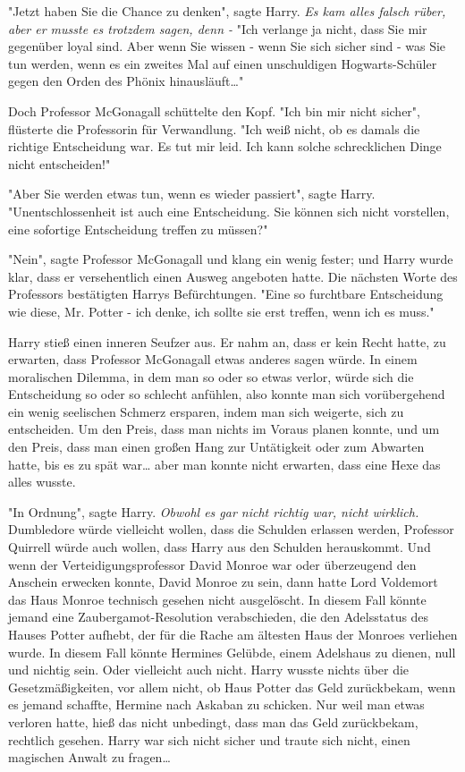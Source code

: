 {"Jetzt haben Sie die Chance zu denken", sagte Harry. \emph{Es kam alles falsch rüber, aber er musste es trotzdem sagen, denn -} "Ich verlange ja nicht, dass Sie mir gegenüber loyal sind. Aber wenn Sie wissen - wenn Sie sich sicher sind - was Sie tun werden, wenn es ein zweites Mal auf einen unschuldigen Hogwarts-Schüler gegen den Orden des Phönix hinausläuft…"

Doch Professor McGonagall schüttelte den Kopf. "Ich bin mir nicht sicher", flüsterte die Professorin für Verwandlung. "Ich weiß nicht, ob es damals die richtige Entscheidung war. Es tut mir leid. Ich kann solche schrecklichen Dinge nicht entscheiden!"

"Aber Sie werden etwas tun, wenn es wieder passiert", sagte Harry. "Unentschlossenheit ist auch eine Entscheidung. Sie können sich nicht vorstellen, eine sofortige Entscheidung treffen zu müssen?"

"Nein", sagte Professor McGonagall und klang ein wenig fester; und Harry wurde klar, dass er versehentlich einen Ausweg angeboten hatte. Die nächsten Worte des Professors bestätigten Harrys Befürchtungen. "Eine so furchtbare Entscheidung wie diese, Mr. Potter - ich denke, ich sollte sie erst treffen, wenn ich es muss."

Harry stieß einen inneren Seufzer aus. Er nahm an, dass er kein Recht hatte, zu erwarten, dass Professor McGonagall etwas anderes sagen würde. In einem moralischen Dilemma, in dem man so oder so etwas verlor, würde sich die Entscheidung so oder so schlecht anfühlen, also konnte man sich vorübergehend ein wenig seelischen Schmerz ersparen, indem man sich weigerte, sich zu entscheiden. Um den Preis, dass man nichts im Voraus planen konnte, und um den Preis, dass man einen großen Hang zur Untätigkeit oder zum Abwarten hatte, bis es zu spät war… aber man konnte nicht erwarten, dass eine Hexe das alles wusste.

"In Ordnung", sagte Harry. \emph{Obwohl es gar nicht richtig war, nicht wirklich.} Dumbledore würde vielleicht wollen, dass die Schulden erlassen werden, Professor Quirrell würde auch wollen, dass Harry aus den Schulden herauskommt. Und wenn der Verteidigungsprofessor David Monroe war oder überzeugend den Anschein erwecken konnte, David Monroe zu sein, dann hatte Lord Voldemort das Haus Monroe technisch gesehen nicht ausgelöscht. In diesem Fall könnte jemand eine Zaubergamot-Resolution verabschieden, die den Adelsstatus des Hauses Potter aufhebt, der für die Rache am ältesten Haus der Monroes verliehen wurde. In diesem Fall könnte Hermines Gelübde, einem Adelshaus zu dienen, null und nichtig sein. Oder vielleicht auch nicht. Harry wusste nichts über die Gesetzmäßigkeiten, vor allem nicht, ob Haus Potter das Geld zurückbekam, wenn es jemand schaffte, Hermine nach Askaban zu schicken. Nur weil man etwas verloren hatte, hieß das nicht unbedingt, dass man das Geld zurückbekam, rechtlich gesehen. Harry war sich nicht sicher und traute sich nicht, einen magischen Anwalt zu fragen…

}
